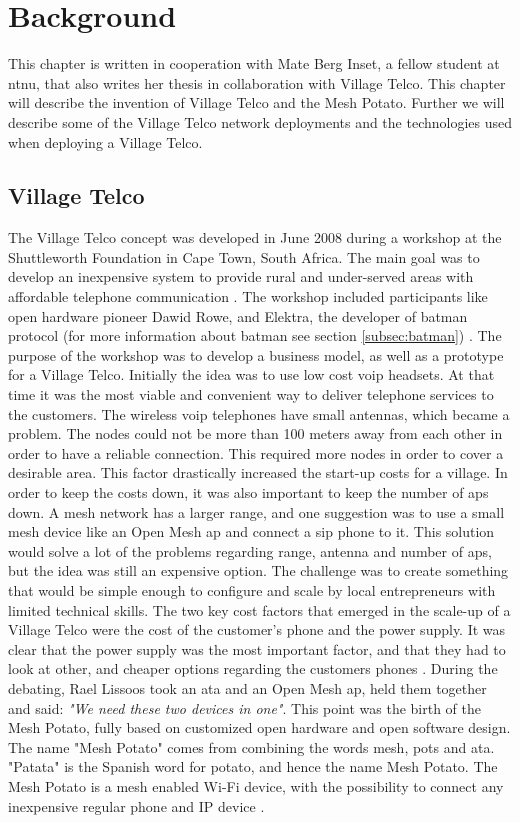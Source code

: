 \chapter{Background}
\label{chp:background} 

This chapter is written in cooperation with Mate Berg Inset, a fellow student at \gls{ntnu}, that also writes her thesis in collaboration with Village Telco. This chapter will describe the invention of Village Telco and the Mesh Potato. Further we will describe some of the Village Telco network deployments and the technologies used when deploying a Village Telco. 

\section{Village Telco}
The Village Telco concept was developed in June 2008 during a workshop at the Shuttleworth Foundation in Cape Town, South Africa. The main goal was to develop an inexpensive system to provide rural and under-served areas with affordable telephone communication \cite{MParticle}. The workshop included participants like open hardware pioneer Dawid Rowe, and Elektra, the developer of \gls{batman} protocol (for more information about \gls{batman} see section \ref{subsec:batman}) \cite{MPworkshop}. The purpose of the workshop was to develop a business model, as well as a prototype for a Village Telco. Initially the idea was to use low cost \gls{voip} headsets. At that time it was the most viable and convenient way to deliver telephone services to the customers. The wireless \gls{voip} telephones have small antennas, which became a problem. The nodes could not be more than 100 meters away from each other in order to have a reliable connection. This required more nodes in order to cover a desirable area. This factor drastically increased the start-up costs for a village. In order to keep the costs down, it was also important to keep the number of \glspl{ap} down. A mesh network has a larger range, and one suggestion was to use a small mesh device like an Open Mesh \gls{ap} and connect a \gls{sip} phone to it. This solution would solve a lot of the problems regarding range, antenna and number of \glspl{ap}, but the idea was still an expensive option. The challenge was to create something that would be simple enough to configure and scale by local entrepreneurs with limited technical skills. The two key cost factors that emerged in the scale-up of a Village Telco were the cost of the customer's phone and the power supply. It was clear that the power supply was the most important factor, and that they had to look at other, and cheaper options regarding the customers phones \cite{MPworkshop}. During the debating, Rael Lissoos took an \gls{ata} and an Open Mesh \gls{ap}, held them together and said: \textit{"We need these two devices in one"}. This point was the birth of the Mesh Potato, fully based on customized open hardware and open software design. The name "Mesh Potato" comes from combining the words mesh, \gls{pots} and \gls{ata}. "Patata" is the Spanish word for potato, and hence the name Mesh Potato. The Mesh Potato is a mesh enabled Wi-Fi device, with the possibility to connect any inexpensive regular phone and IP device \cite{MPorigin}.


